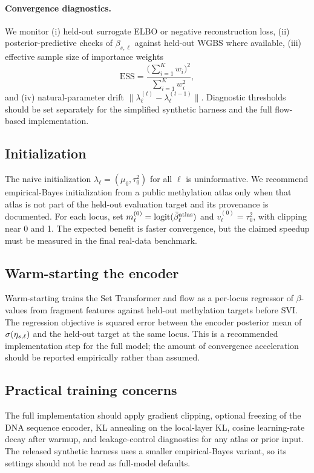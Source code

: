 \paragraph{Convergence diagnostics.} We monitor (i) held-out surrogate ELBO or negative reconstruction loss, (ii) posterior-predictive checks of $\beta_{s,\ell}$ against held-out WGBS where available, (iii) effective sample size of importance weights
\begin{equation}
\mathrm{ESS} = \frac{\big(\sum_{i=1}^K w_i\big)^2}{\sum_{i=1}^K w_i^2},
\end{equation}
and (iv) natural-parameter drift $\|\lambda_\ell^{(t)}-\lambda_\ell^{(t-1)}\|$. Diagnostic thresholds should be set separately for the simplified synthetic harness and the full flow-based implementation.

\subsection{Initialization}
The naive initialization $\lambda_\ell=(\mu_0,\tau_0^2)$ for all $\ell$ is uninformative. We recommend empirical-Bayes initialization from a public methylation atlas only when that atlas is not part of the held-out evaluation target and its provenance is documented. For each locus, set $m_\ell^{(0)}=\mathrm{logit}(\bar\beta^{\mathrm{atlas}}_\ell)$ and $v_\ell^{(0)}=\tau_0^2$, with clipping near 0 and 1. The expected benefit is faster convergence, but the claimed speedup must be measured in the final real-data benchmark.

\subsection{Warm-starting the encoder}
\label{ssec:warmstart}
Warm-starting trains the Set Transformer and flow as a per-locus regressor of $\beta$-values from fragment features against held-out methylation targets before SVI. The regression objective is squared error between the encoder posterior mean of $\sigma(\eta_{s,\ell})$ and the held-out target at the same locus. This is a recommended implementation step for the full model; the amount of convergence acceleration should be reported empirically rather than assumed.

\subsection{Practical training concerns}
The full implementation should apply gradient clipping, optional freezing of the DNA sequence encoder, KL annealing on the local-layer KL, cosine learning-rate decay after warmup, and leakage-control diagnostics for any atlas or prior input. The released synthetic harness uses a smaller empirical-Bayes variant, so its settings should not be read as full-model defaults.

